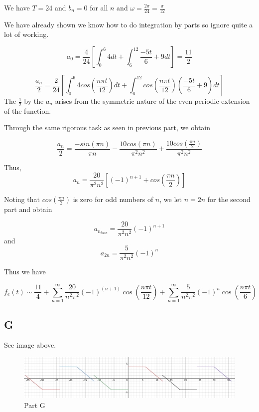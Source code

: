 \documentclass{article}
\begin{document}
We have $T=24$ and $b_n=0$ for all $n$ and $\omega = \frac{2\pi}{24} = \frac{\pi}{12}$

We have already shown we know how to do integration by parts so ignore quite a lot of working.

$$
a_0 = \frac{4}{24} \left[ \int_0^6 4 dt + \int_6^{12} \frac{-5t}{6} + 9 dt \right] = \frac{11}{2}
$$

$$
\frac{a_n}{2} = \frac{2}{24} \left[ \int_0^{6} 4 cos\left( \frac{n \pi t}{12} \right) dt + \int_6^{12} cos\left(\frac{n \pi t}{12}\right)\left(\frac{-5t}{6}+9\right)dt\right]
$$
The $\frac{1}{2}$ by the $a_n$ arises from the symmetric nature of the even periodic extension of the function.

Through the same rigorous task as seen in previous part, we obtain

$$
\frac{a_n}{2} = \frac{-sin(\pi n)}{\pi n} - \frac{10cos(\pi n)}{\pi^2 n^2} + \frac{10cos(\frac{\pi n}{2})}{\pi^2 n^2}
$$

Thus,
$$
a_n =\frac{20}{\pi^2n^2} \left[ \left(-1\right)^{n+1} +cos\left(\frac{\pi n}{2}\right) \right]
$$

Noting that $cos\left(\frac{\pi n}{2}\right)$ is zero for odd numbers of $n$, we let $n=2n$ for the second part and obtain

$$
a_{n_{base}}  =\frac{20}{\pi^2n^2} \left(-1\right)^{n+1}
$$
and
$$
a_{2n} = \frac{5}{\pi^2 n^2} \left(-1\right)^{n}
$$

Thus we have

$$
f_e(t) \sim \frac{11}{4}+\sum_{n=1}^{\infty}\frac{20}{n^{2}\pi^{2}}\left(-1\right)^{\left(n+1\right)}\cos\left(\frac{n\pi t}{12}\right) + \sum_{n=1}^{\infty}\frac{5}{n^{2}\pi^{2}}\left(-1\right)^{n}\cos\left(\frac{n\pi t}{6}\right)
$$

\subsection*{G}

See image above.

\begin{figure}
\centering
\includegraphics[width=1.0\textwidth]{./static/graph5.png}
\caption{Part G}
\end{figure}
\end{document}

